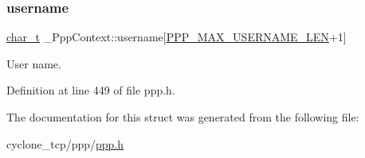 \subsubsection{\texorpdfstring{username}{username}}
{\footnotesize\ttfamily \hyperlink{compiler__port_8h_a40bb5262bf908c328fbcfbe5d29d0201}{char\+\_\+t} \+\_\+\+Ppp\+Context\+::username\mbox{[}\hyperlink{ppp_8h_acafaf0139acdee8a293aa63cd32666b6}{P\+P\+P\+\_\+\+M\+A\+X\+\_\+\+U\+S\+E\+R\+N\+A\+M\+E\+\_\+\+L\+EN}+1\mbox{]}}



User name. 



Definition at line 449 of file ppp.\+h.



The documentation for this struct was generated from the following file\+:\begin{DoxyCompactItemize}
\item 
cyclone\+\_\+tcp/ppp/\hyperlink{ppp_8h}{ppp.\+h}\end{DoxyCompactItemize}
